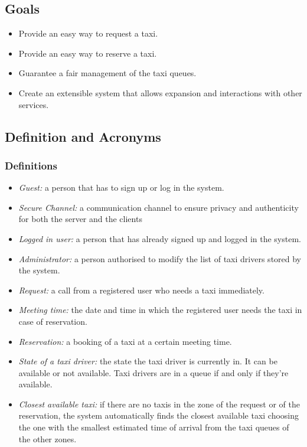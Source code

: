 \documentclass{article}
\begin{document}
\subsection{Goals}
\begin{itemize}
	\item Provide an easy way to request a taxi.
	\item Provide an easy way to reserve a taxi.
	\item Guarantee a fair management of the taxi queues.
	\item Create an extensible system that allows expansion and interactions with other services.
\end{itemize}

\subsection{Definition and Acronyms}

\subsubsection{Definitions}
\begin{itemize}
	\item \textit{Guest:} a person that has to sign up or log in the system.
	\item \textit{Secure Channel:} a communication channel to ensure privacy and authenticity for both the server and the clients 
	\item \textit{Logged in user:} a person that has already signed up and logged in the system.
	\item \textit{Administrator:} a person authorised to modify the list of taxi drivers stored by the system.
	\item \textit{Request:} a call from a registered user who needs a taxi immediately.
	\item \textit{Meeting time:} the date and time in which the registered user needs the taxi in case of reservation. %
	\item \textit{Reservation:} a booking of a taxi at a certain meeting time.
	\item \textit{State of a taxi driver:} the state the taxi driver is currently in. It can be available or not available. Taxi drivers are in a queue if and only if they're available.
	\item \textit{Closest available taxi:} if there are no taxis in the zone of the request or of the reservation, the system automatically finds the closest available taxi choosing the one with the smallest estimated time of arrival from the taxi queues of the other zones.
\end{itemize}
\end{document}
